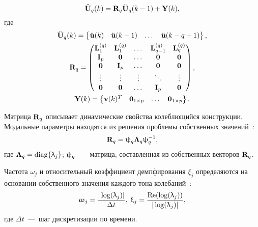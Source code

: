 \begin{equation}
	\ddot{\mathbf{U}}_q(k) = \mathbf{R}_q \ddot{\mathbf{U}}_q(k - 1) + \mathbf{Y}(k),
\end{equation} 
где 
\begin{equation}
	\begin{gathered}
		\ddot{\mathbf{U}}_q(k) = \begin{Bmatrix} \ddot{\mathbf{u}}(k) & \ddot{\mathbf{u}}(k - 1) & \dots & \ddot{\mathbf{u}}(k - q + 1) \end{Bmatrix}, \\
		\mathbf{R}_q = 
		\begin{pmatrix}
			\mathbf{L}_1^{(q)} & \mathbf{L}_1^{(q)} & \dots & \mathbf{L}_{q-1}^{(q)} & \mathbf{L}_q^{(q)} \\
			\mathbf{I}_p & \mathbf{0} & \dots & \mathbf{0} & \mathbf{0} \\ 
			\mathbf{0} & \mathbf{I}_p & \dots & \mathbf{0} & \mathbf{0} \\ 
			\vdots & \vdots & \vdots & \ddots & \vdots \\ 
			\mathbf{0} & \mathbf{0} & \dots & \mathbf{I}_p & \mathbf{0} 
		\end{pmatrix}, \\
		\mathbf{Y}(k) = \begin{Bmatrix} \mathbf{v}(k) ^ T & \mathbf{0}_{1 \times p} & \dots & \mathbf{0}_{1 \times p} \end{Bmatrix}.
	\end{gathered}
\end{equation}

Матрица $ \mathbf{R}_q $ описывает динамические свойства колеблющийся конструкции. Модальные параметры находятся из решения проблемы собственных значений~\cite{lib:oma:Maia}:
\begin{equation}
	\mathbf{R}_q = \uppsi_q \mathbf{\Lambda}_q \uppsi_q^{-1},
\end{equation}
где $ \mathbf{\Lambda}_q = \operatorname{diag} \{ \uplambda_j \} $; $ \mathbf{\uppsi}_q $~---~матрица, составленная из собственных векторов $ \mathbf{R}_q $.

Частота $ \omega_j $ и относительный коэффициент демпфирования $ \xi_j $ определяются на основании собственного значения каждого тона колебаний~\cite{lib:oma:Nafid}:
\begin{equation}
	\begin{gathered}
		\upomega_j = \frac{|\log(\uplambda_j)|}{\Delta t}, \:
		\upxi_j = \frac{\operatorname{Re}(\log(\uplambda_j))}{|\log(\uplambda_j)|},
	\end{gathered}
\end{equation}
где $ \Delta t $~---~шаг дискретизации по времени.

